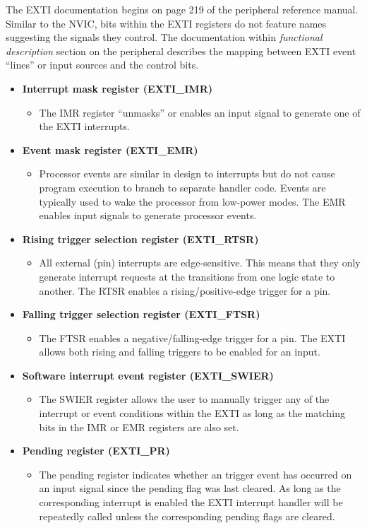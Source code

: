 \documentclass[11pt,fleqn]{book} %
\begin{document}
The EXTI documentation begins on page 219 of the peripheral reference manual. Similar to the NVIC, bits within the EXTI registers do not feature names suggesting the signals they control. The documentation within \textit{functional description} section on the peripheral describes the mapping between EXTI event ``lines'' or input sources and the control bits. 


\begin{itemize}
    \item \textbf{Interrupt mask register (EXTI\_IMR)}
    \begin{itemize}
        \item The IMR register ``unmasks'' or enables an input signal to generate one of the EXTI interrupts.
    \end{itemize}
    \item \textbf{Event mask register (EXTI\_EMR)}
    \begin{itemize}
        \item Processor events are similar in design to interrupts but do not cause program execution to branch to separate handler code. Events are typically used to wake the processor from low-power modes. The EMR enables input signals to generate processor events. 
    \end{itemize}
    \item \textbf{Rising trigger selection register (EXTI\_RTSR)}
    \begin{itemize}
        \item All external (pin) interrupts are edge-sensitive. This means that they only generate interrupt requests at the transitions from one logic state to another. The RTSR enables a rising/positive-edge trigger for a pin.
    \end{itemize}
    \item \textbf{Falling trigger selection register (EXTI\_FTSR)}
    \begin{itemize}
        \item The FTSR enables a negative/falling-edge trigger for a pin. The EXTI allows both rising and falling triggers to be enabled for an input.  
    \end{itemize}
    \item \textbf{Software interrupt event register (EXTI\_SWIER)}
    \begin{itemize}
        \item The SWIER register allows the user to manually trigger any of the interrupt or event conditions within the EXTI as long as the matching bits in the IMR or EMR registers are also set. 
    \end{itemize}
    \item \textbf{Pending register (EXTI\_PR)}
    \begin{itemize}
        \item  The pending register indicates whether an trigger event has occurred on an input signal since the pending flag was last cleared. As long as the corresponding interrupt is enabled the EXTI interrupt handler will be repeatedly called unless the corresponding pending flags are cleared. 
    \end{itemize}
\end{itemize}
\end{document}
